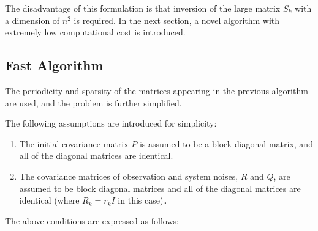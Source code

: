 \documentclass[aip,graphicx]{revtex4-1}
\begin{document}
The disadvantage of this formulation is that inversion of the large matrix $S_k$ with a dimension of $n^2$ is required.
In the next section, a novel algorithm with extremely low computational cost is introduced.
\subsection{Fast Algorithm}
\label{sec:fast_algo}
The periodicity and sparsity of the matrices appearing in the previous algorithm are used, and the problem is further simplified. 

The following assumptions are introduced for simplicity:
\begin{enumerate}
	\item{The initial covariance matrix $P$ is assumed to be a block diagonal matrix, and all of the diagonal matrices are identical.}
	\item{The covariance matrices of observation and system noises, $R$ and $Q$, are assumed to be block diagonal matrices and all of the diagonal matrices are identical (where $R_k=r_k I$ in this case)．}
\end{enumerate}
The above conditions are expressed as follows:
\end{document}
